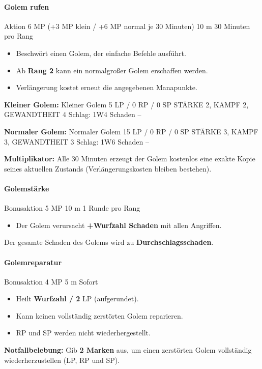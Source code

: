 \paragraph*{Golem rufen}

\spellcard
{}
{Aktion}
{6 MP (+3 MP klein / +6 MP normal je 30 Minuten)}
{10 m}
{30 Minuten pro Rang}
{
	\begin{itemize}
		\item Beschwört einen Golem, der einfache Befehle ausführt.
		\item Ab \textbf{Rang 2} kann ein normalgroßer Golem erschaffen werden.
		\item Verlängerung kostet erneut die angegebenen Manapunkte.
	\end{itemize}
	
	\medskip
	\textbf{Kleiner Golem:}
	\creatureblock
	{Kleiner Golem}
	{5 LP / 0 RP / 0 SP}
	{STÄRKE 2, KAMPF 2, GEWANDTHEIT 4}
	{Schlag: 1W4 Schaden}
	{--}
	
	\medskip
	\textbf{Normaler Golem:}
	\creatureblock
	{Normaler Golem}
	{15 LP / 0 RP / 0 SP}
	{STÄRKE 3, KAMPF 3, GEWANDTHEIT 3}
	{Schlag: 1W6 Schaden}
	{--}
}
{
	\textbf{Multiplikator:}
	Alle 30 Minuten erzeugt der Golem kostenlos eine exakte Kopie seines aktuellen Zustands
	(Verlängerungskosten bleiben bestehen).
}


\paragraph*{Golemstärke}

\spellcard
{}
{Bonusaktion}
{5 MP}
{10 m}
{1 Runde pro Rang}
{
	\begin{itemize}
		\item Der Golem verursacht \textbf{+Wurfzahl Schaden} mit allen Angriffen.
	\end{itemize}
}
{
	Der gesamte Schaden des Golems wird zu \textbf{Durchschlagsschaden}.
}


\paragraph*{Golemreparatur}

\spellcard
{}
{Bonusaktion}
{4 MP}
{5 m}
{Sofort}
{
	\begin{itemize}
		\item Heilt \textbf{Wurfzahl / 2} LP (aufgerundet).
		\item Kann keinen vollständig zerstörten Golem reparieren.
		\item RP und SP werden nicht wiederhergestellt.
	\end{itemize}
}
{
	\textbf{Notfallbelebung:}
	Gib \textbf{2 Marken} aus, um einen zerstörten Golem vollständig wiederherzustellen
	(LP, RP und SP).
}


